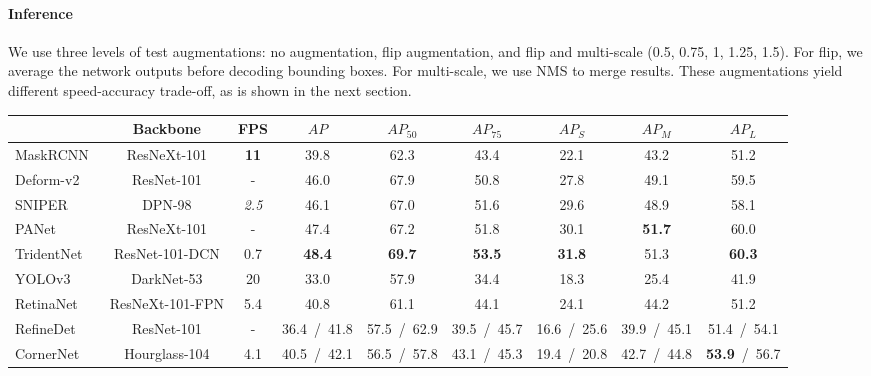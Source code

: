 \documentclass[10pt,twocolumn,letterpaper]{article}
\begin{document}
\paragraph{Inference}
We use three levels of test augmentations: no augmentation, flip augmentation, and flip and multi-scale (0.5, 0.75, 1, 1.25, 1.5).
For flip, we average the network outputs before decoding bounding boxes. For multi-scale, we use NMS to merge results.
These augmentations yield different speed-accuracy trade-off, as is shown in the next section.

{
\setlength{\tabcolsep}{5pt}
\begin{table}[t]
\centering
\begin{tabular}{l@{}c@{\ \ }ccccccc}
\toprule
& Backbone & FPS & $AP$ & $AP_{50}$ & $AP_{75}$ & $AP_{S}$ & $AP_{M}$ & $AP_{L}$  \\
\midrule
        MaskRCNN~\cite{he2017mask} & ResNeXt-101 & \textbf{11} & 39.8 & 62.3 & 43.4 & 22.1 & 43.2 & 51.2 \\
        Deform-v2~\cite{zhu2018deformable} & ResNet-101 & - & 46.0 & 67.9 & 50.8 & 27.8 & 49.1 & 59.5 \\
        SNIPER~\cite{sniper2018} & DPN-98 & \textit{2.5} & 46.1 & 67.0 & 51.6 & 29.6 & 48.9 & 58.1  \\
        PANet~\cite{liu2018path} & ResNeXt-101 & - &  47.4 & 67.2 & 51.8 & 30.1& \textbf{51.7}& 60.0\\ 
        TridentNet~\cite{li2019scale} & ResNet-101-DCN & 0.7 &  \textbf{48.4} & \textbf{69.7} & \textbf{53.5} & \textbf{31.8} & 51.3 & \textbf{60.3}\\
        \midrule
        YOLOv3~\cite{redmon2018yolov3} & DarkNet-53 & 20 &  33.0 & 57.9 & 34.4&  18.3 & 25.4 & 41.9 \\
        RetinaNet~\cite{lin2018focal} & ResNeXt-101-FPN & 5.4 & 40.8 & 61.1 & 44.1 &  24.1 & 44.2 & 51.2 \\
        RefineDet~\cite{zhang2018single} & ResNet-101 & - &  36.4\ /\ 41.8 & 57.5\ /\ 62.9 & 39.5\ /\ 45.7 &  16.6\ /\ 25.6 & 39.9\ /\ 45.1 & 51.4\ /\ 54.1\\
        CornerNet~\cite{Law_2018_ECCV} & Hourglass-104 & 4.1 &  40.5\ /\ 42.1 & 56.5\ /\ 57.8 & 43.1\ /\ 45.3 &  19.4\ /\ 20.8 & 42.7\ /\ 44.8 & \textbf{53.9}\ /\ 56.7 \\

\end{tabular}
\end{table}}
\end{document}
